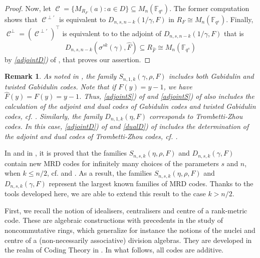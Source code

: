 \documentclass[a4paper, 11pt]{article}
\DeclareMathOperator{\C}{\mathcal{C}}
\newtheorem{remark}[theorem]{Remark}
\newcommand{\F}{{\mathbb F}}
\begin{document}
\begin{proof}
Now, let  \(
\C=\{M_{R_F}(a) \colon a \in D\} \subseteq M_n(\F_{q^s}). \)
The former computation shows that $\C^{\perp'}$ is equivalent to $D_{n,s,n-k}(1/\gamma,F)$ in $R_F \cong M_n(\F_{q^s})$. Finally, $\C^{\perp}=(\C^{\perp'})^{\top}$ is equivalent to to the adjoint of $D_{n,s,n-k}(1/\gamma,F)$ that is
\[
D_{n,s,n-k}(\sigma^{sk}(\gamma),\hat{F}) \subseteq R_{\hat{F}} \cong M_n(\F_{q^s})
\]
by \emph{\ref{adjointD})} of , that proves our assertion.
\end{proof}

\begin{remark}
As noted in , the family $S_{n,1,k}(\gamma,\rho,F)$ includes both Gabidulin and twisted Gabidulin codes. Note that if $F(y) = y - 1$, we have $\hat{F}(y) = F(y) = y - 1$. Thus, \ref{adjointS}) of  and \ref{adjointS}) of  also includes the calculation of the adjoint and dual codes of Gabidulin codes and twisted Gabidulin codes, cf. \cite[Theorem 6]{sheekey2016new}. Similarly, the family $D_{n,1,k}(\eta,F)$ corresponds to Trombetti-Zhou codes. In this case, \ref{adjointD}) of  and \ref{dualD}) of  includes the determination of the adjoint and dual codes of Trombetti-Zhou codes, cf. \cite[Propositions 4 and 5]{trombetti2018new}.
\end{remark}


In \cite{sheekey2020new} and in \cite{lobillo2025quotients}, it is proved that the families $S_{n,s,k}(\eta,\rho,F)$ and $D_{n,s,k}(\gamma,F)$ contain new MRD codes for infinitely many choices of the parameters $s$ and $n$, when $k \leq  n/2$, cf. \cite[Theorem 11]{sheekey2020new} and \cite[Theorem 6.3]{lobillo2025quotients}.  As a result, the families $S_{n,s,k}(\eta,\rho,F)$ and $D_{n,s,k}(\gamma,F)$ represent the largest known families of MRD codes. Thanks to the tools developed here, we are able to extend this result to the case $k > n/2$.



First, we recall the notion of idealisers, centralisers and centre of a rank-metric code. These are algebraic constructions with precedents in the study of noncommutative rings, which generalize for instance the notions of the nuclei and centre of a (non-necessarily associative) division algebras. They are developed in the realm of Coding Theory in  \cite{liebhold2016automorphism,lunardon2018nuclei,sheekey2020new}. In what follows, all codes are additive. 
\end{document}
